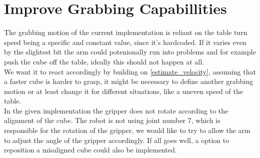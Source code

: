 \documentclass[report]{iisthesis}
\begin{document}
\section{Improve Grabbing Capabillities}
\label{improve_grabbing}
The grabbing motion of the current implementation is reliant on the table turn speed being a specific and constant value, since it's hardcoded. If it varies even by the slightest bit
the arm could potenionally run into problems and for example push the cube off the table, ideally this should not happen at all. \\
We want it to react accordingly by building on \ref{estimate_velocity}, assuming that a faster cube is harder to grasp, it might be necessary to define another grabbing motion 
or at least change it for different situations, like a uneven speed of the table. \\
In the given implementation the gripper does not rotate according to the alignment of the cube. The robot is not using joint number 7, which is responsible for the rotation of the gripper, we would like to try to allow the arm to adjust the angle of the gripper accordingly.
If all goes well, a option to reposition a misaligned cube could also be implemented.
\end{document}
